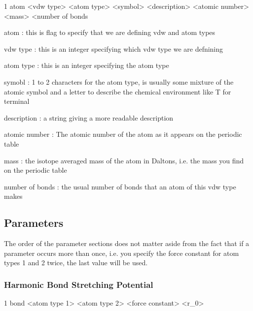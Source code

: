 \begin{DoxyCode}
1 atom <vdw type> <atom type> <symbol> <description> <atomic number> <mass> <number of bonds
\end{DoxyCode}



\begin{DoxyItemize}
\item {\ttfamily atom} \+: this is flag to specify that we are defining vdw and atom types
\item {\ttfamily vdw type} \+: this is an integer specifying which vdw type we are defnining
\item {\ttfamily atom type} \+: this is an integer specifying the atom type
\item {\ttfamily symobl} \+: 1 to 2 characters for the atom type, is usually some mixture of the atomic symbol and a letter to describe the chemical environment like T for terminal
\item {\ttfamily description} \+: a string giving a more readable description
\item {\ttfamily atomic number} \+: The atomic number of the atom as it appears on the periodic table
\item {\ttfamily mass} \+: the isotope averaged mass of the atom in Daltons, i.\+e. the mass you find on the periodic table
\item {\ttfamily number of bonds} \+: the usual number of bonds that an atom of this vdw type makes
\end{DoxyItemize}

\subsection*{Parameters}

The order of the parameter sections does not matter aside from the fact that if a parameter occurs more than once, i.\+e. you specify the force constant for atom types 1 and 2 twice, the last value will be used.

\subsubsection*{Harmonic Bond Stretching Potential}


\begin{DoxyCode}
1 bond   <atom type 1>  <atom type 2> <force constant> <r\_0>
\end{DoxyCode}



